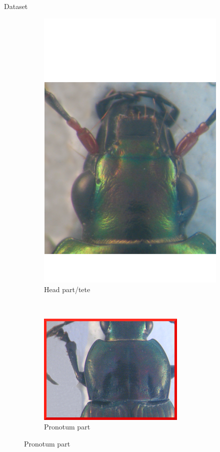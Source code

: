 \documentclass[10pt,svgnames]{beamer}
\begin{document}
\begin{frame}[c]{Dataset}
\begin{figure}[htbp]
\begin{subfigure}[t]{0.3\textwidth}
        			\centering
        			\includegraphics[scale=.2]{images/tete2}
        			\caption*{\footnotesize{Head part/tete}}
        			\label{figsub22}
    			\end{subfigure}
    			~ 
    			\begin{subfigure}[t]{0.33\textwidth}
        			\centering
        			\includegraphics[scale=1.1]{images/pronotum}
        			\caption*{\footnotesize{Pronotum part}}
        			\label{figsub22}
    			\end{subfigure}
			\end{figure}
\end{frame}
\end{document}
